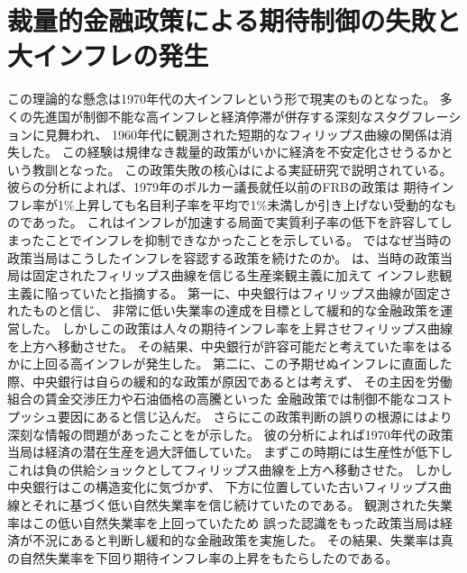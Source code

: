 \section{裁量的金融政策による期待制御の失敗と大インフレの発生}
\label{sec:review_failure_of_discretionary_policy}



この理論的な懸念は1970年代の大インフレという形で現実のものとなった\parencite[][などを参照]{ClaridaGaliGertler1999,Mishkin1999,GoodfriendKing1997}。
多くの先進国が制御不能な高インフレと経済停滞が併存する深刻なスタグフレーションに見舞われ、
1960年代に観測された短期的なフィリップス曲線の関係は消失した。
この経験は規律なき裁量的政策がいかに経済を不安定化させうるかという教訓となった。
この政策失敗の核心は\textcite{ClaridaGaliGertler2000}による実証研究で説明されている。
彼らの分析によれば、1979年のボルカー議長就任以前のFRBの政策は
期待インフレ率が1\%上昇しても名目利子率を平均で1\%未満しか引き上げない受動的なものであった。
これはインフレが加速する局面で実質利子率の低下を許容してしまったことでインフレを抑制できなかったことを示している。
ではなぜ当時の政策当局はこうしたインフレを容認する政策を続けたのか。
\textcite{Bernanke2004}は、当時の政策当局は固定されたフィリップス曲線を信じる生産楽観主義に加えて
インフレ悲観主義に陥っていたと指摘する。
第一に、中央銀行はフィリップス曲線が固定されたものと信じ、
非常に低い失業率の達成を目標として緩和的な金融政策を運営した。
しかしこの政策は人々の期待インフレ率を上昇させフィリップス曲線を上方へ移動させた。
その結果、中央銀行が許容可能だと考えていた率をはるかに上回る高インフレが発生した。
第二に、この予期せぬインフレに直面した際、中央銀行は自らの緩和的な政策が原因であるとは考えず、
その主因を労働組合の賃金交渉圧力や石油価格の高騰といった
金融政策では制御不能なコストプッシュ要因にあると信じ込んだ。
さらにこの政策判断の誤りの根源にはより深刻な情報の問題があったことを\textcite{Orphanides2003}が示した。
彼の分析によれば1970年代の政策当局は経済の潜在生産を過大評価していた。
まずこの時期には生産性が低下しこれは負の供給ショックとしてフィリップス曲線を上方へ移動させた。
しかし中央銀行はこの構造変化に気づかず、
下方に位置していた古いフィリップス曲線とそれに基づく低い自然失業率を信じ続けていたのである。
観測された失業率はこの低い自然失業率を上回っていたため
誤った認識をもった政策当局は経済が不況にあると判断し緩和的な金融政策を実施した。
その結果、失業率は真の自然失業率を下回り期待インフレ率の上昇をもたらしたのである。

